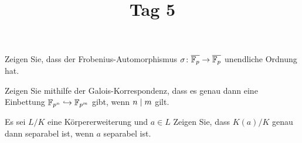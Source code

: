 \documentclass[a4paper, 10pt]{scrartcl}
\title{Tag 5}
\author{}
\date{}
\begin{document}
\begin{question}
  Zeigen Sie, dass der Frobenius-Automorphismus $\sigma \colon \overline{\mathbb{F}_p} \to \overline{\mathbb{F}_p}$ unendliche Ordnung hat.
\end{question}

\begin{question}
  Zeigen Sie mithilfe der Galois-Korrespondenz, dass es genau dann eine Einbettung $\mathbb{F}_{p^n} \hookrightarrow \mathbb{F}_{p^m}$ gibt, wenn $n \mathrel{|} m$ gilt.
\end{question}

\begin{question}
  Es sei $L/K$ eine Körpererweiterung und $a \in L$
  Zeigen Sie, dass $K(a)/K$ genau dann separabel ist, wenn $a$ separabel ist.
\end{question}
\end{document}

